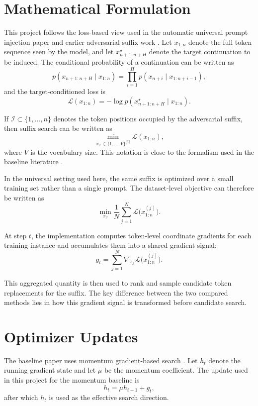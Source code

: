 \documentclass[12pt,a4paper]{report}
\begin{document}
\section{Mathematical Formulation}
This project follows the loss-based view used in the automatic universal prompt injection paper and earlier adversarial suffix work \cite{liu2024upi,zou2023gcg}. Let $x_{1:n}$ denote the full token sequence seen by the model, and let $x_{n+1:n+H}^{\star}$ denote the target continuation to be induced. The conditional probability of a continuation can be written as
\begin{equation}
    p(x_{n+1:n+H}\mid x_{1:n}) = \prod_{i=1}^{H} p(x_{n+i}\mid x_{1:n+i-1}),
\end{equation}
and the target-conditioned loss is
\begin{equation}
    \mathcal{L}(x_{1:n}) = -\log p(x_{n+1:n+H}^{\star}\mid x_{1:n}).
\end{equation}

If $\mathcal{I}\subset\{1,\dots,n\}$ denotes the token positions occupied by the adversarial suffix, then suffix search can be written as
\begin{equation}
    \min_{x_{\mathcal{I}}\in\{1,\dots,V\}^{|\mathcal{I}|}} \mathcal{L}(x_{1:n}),
\end{equation}
where $V$ is the vocabulary size. This notation is close to the formalism used in the baseline literature \cite{liu2024upi,zou2023gcg}.

In the universal setting used here, the same suffix is optimized over a small training set rather than a single prompt. The dataset-level objective can therefore be written as
\begin{equation}
    \min_{x_{\mathcal{I}}} \frac{1}{N}\sum_{j=1}^{N} \mathcal{L}\bigl(x^{(j)}_{1:n}\bigr).
\end{equation}

At step $t$, the implementation computes token-level coordinate gradients for each training instance and accumulates them into a shared gradient signal:
\begin{equation}
    g_t = \sum_{j=1}^{N} \nabla_{x_{\mathcal{I}}}\mathcal{L}\bigl(x_{1:n}^{(j)}\bigr).
\end{equation}

This aggregated quantity is then used to rank and sample candidate token replacements for the suffix. The key difference between the two compared methods lies in how this gradient signal is transformed before candidate search.

\section{Optimizer Updates}
The baseline paper uses momentum gradient-based search \cite{liu2024upi}. Let $h_t$ denote the running gradient state and let $\mu$ be the momentum coefficient. The update used in this project for the momentum baseline is
\begin{equation}
    h_t = \mu h_{t-1} + g_t,
\end{equation}
after which $h_t$ is used as the effective search direction.
\end{document}
